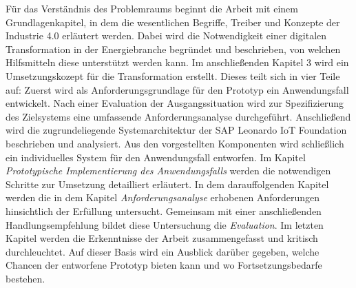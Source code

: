 Für das Verständnis des Problemraums beginnt die Arbeit mit einem Grundlagenkapitel, in dem die wesentlichen Begriffe, Treiber und Konzepte der Industrie 4.0 erläutert werden. Dabei wird die Notwendigkeit einer digitalen Transformation in der Energiebranche begründet und beschrieben, von welchen  Hilfsmitteln diese unterstützt werden kann. Im anschließenden Kapitel 3 wird ein Umsetzungskozept für die Transformation erstellt. Dieses teilt sich in vier Teile auf: Zuerst wird als Anforderungsgrundlage für den Prototyp ein Anwendungsfall entwickelt. Nach einer Evaluation der Ausgangssituation wird zur Spezifizierung des Zielsystems eine umfassende Anforderungsanalyse durchgeführt. Anschließend wird die zugrundeliegende Systemarchitektur der SAP Leonardo IoT Foundation beschrieben und analysiert. Aus den vorgestellten Komponenten wird schließlich ein individuelles System für den Anwendungsfall entworfen. Im Kapitel \textit{Prototypische Implementierung des Anwendungsfalls} werden die notwendigen Schritte zur Umsetzung detailliert erläutert. In dem darauffolgenden Kapitel werden die in dem Kapitel \textit{Anforderungsanalyse} erhobenen Anforderungen hinsichtlich der Erfüllung untersucht. Gemeinsam mit einer anschließenden Handlungsempfehlung bildet diese Untersuchung die \textit{Evaluation}. Im letzten Kapitel werden die Erkenntnisse der Arbeit zusammengefasst und kritisch durchleuchtet. Auf dieser Basis wird ein Ausblick darüber gegeben, welche Chancen der entworfene Prototyp bieten kann und wo Fortsetzungsbedarfe bestehen. 

\newpage
